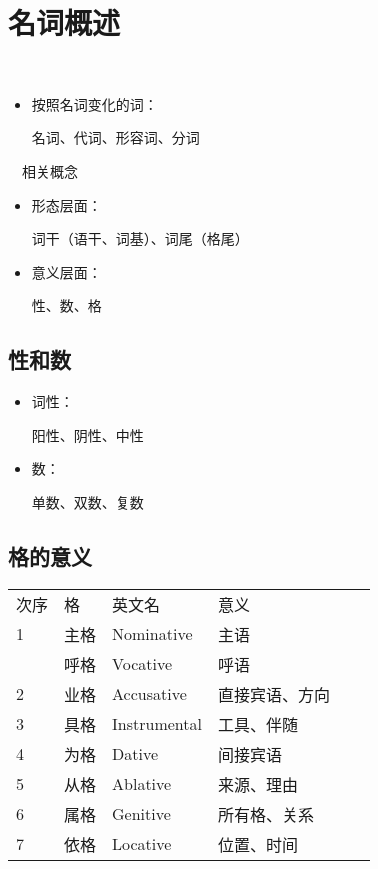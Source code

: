 \documentclass[17pt]{beamer}
\begin{document}
\section{名词概述}
\begin{frame}{\insertsection }
    \tableofcontents[currentsection]
\end{frame}

\begin{frame}{\insertsection ~~\insertsubsection}
  \begin{itemize}
    \item 按照名词变化的词：
    
    名词、代词、形容词、分词
  \end{itemize}
\end{frame}

\begin{frame}{\insertsection ~~相关概念}
  \begin{itemize}
    \item 形态层面：
    
    词干（语干、词基）、词尾（格尾）
    \item 意义层面：
      
    性、数、格
  \end{itemize}
\end{frame}

\subsection{性和数}
\begin{frame}{\insertsubsection}
  \begin{itemize}
    \item
      词性：
      
      阳性、阴性、中性
    \item
      数：
      
      单数、双数、复数
  \end{itemize}  
\end{frame}

\subsection{格的意义}
\begin{frame}{\insertsubsection}
  \small
  \centering
  \begin{tabular}{@{}llllll@{}} %
    次序 & 格 & 英文名 & 意义  \\
    1 & 主格 & Nominative & 主语  \\
     & 呼格 & Vocative & 呼语  \\
    2 & 业格 & Accusative & 直接宾语、方向 \\
    3 & 具格 & Instrumental & 工具、伴随  \\
    4 & 为格 & Dative & 间接宾语  \\
    5 & 从格 & Ablative & 来源、理由  \\  
    6 & 属格 & Genitive & 所有格、关系  \\
    7 & 依格 & Locative & 位置、时间  \\ 
  \end{tabular}
\end{frame}
\end{document}
